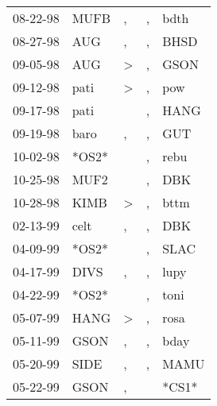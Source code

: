 \begin{supertabular}{p{0.07\textwidth}p{0.06\textwidth}p{0.02\textwidth}p{0.02\textwidth}p{0.06\textwidth}}
 08-22-98\textsuperscript{} &  MUFB\textsuperscript{} &             , &  , &           bdth\textsuperscript{} \\
 08-27-98\textsuperscript{} &   AUG\textsuperscript{} &             , &  , &           BHSD\textsuperscript{} \\
 09-05-98\textsuperscript{} &   AUG\textsuperscript{} &  \textgreater &  , &           GSON\textsuperscript{} \\
 09-12-98\textsuperscript{} &  pati\textsuperscript{} &  \textgreater &  , &            pow\textsuperscript{} \\
 09-17-98\textsuperscript{} &  pati\textsuperscript{} &               &  , &           HANG\textsuperscript{} \\
 09-19-98\textsuperscript{} &  baro\textsuperscript{} &             , &  , &            GUT\textsuperscript{} \\
 10-02-98\textsuperscript{} &                   *OS2* &               &  , &           rebu\textsuperscript{} \\
 10-25-98\textsuperscript{} &  MUF2\textsuperscript{} &               &  , &            DBK\textsuperscript{} \\
 10-28-98\textsuperscript{} &  KIMB\textsuperscript{} &  \textgreater &  , &           bttm\textsuperscript{} \\
 02-13-99\textsuperscript{} &  celt\textsuperscript{} &             , &  , &            DBK\textsuperscript{} \\
 04-09-99\textsuperscript{} &                   *OS2* &               &  , &           SLAC\textsuperscript{} \\
 04-17-99\textsuperscript{} &  DIVS\textsuperscript{} &             , &  , &           lupy\textsuperscript{} \\
 04-22-99\textsuperscript{} &                   *OS2* &               &  , &           toni\textsuperscript{} \\
 05-07-99\textsuperscript{} &  HANG\textsuperscript{} &  \textgreater &  , &           rosa\textsuperscript{} \\
 05-11-99\textsuperscript{} &  GSON\textsuperscript{} &             , &  , &           bday\textsuperscript{} \\
 05-20-99\textsuperscript{} &  SIDE\textsuperscript{} &             , &  , &           MAMU\textsuperscript{} \\
 05-22-99\textsuperscript{} &  GSON\textsuperscript{} &             , &    &                            *CS1* \\

\end{supertabular}
